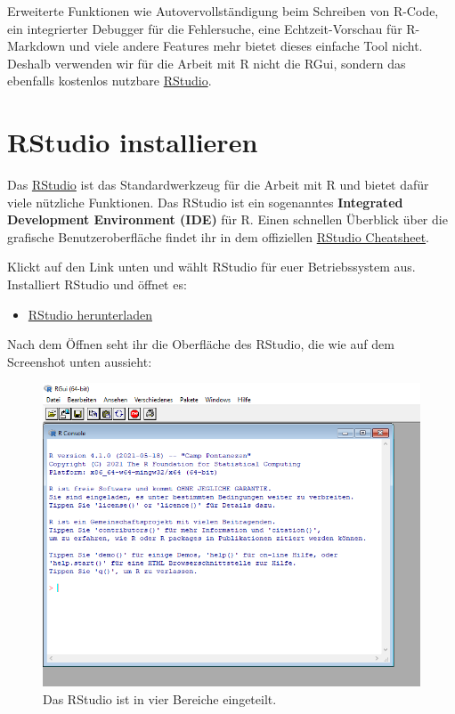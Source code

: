 \documentclass[
]{book}
\providecommand{\tightlist}{%
  \setlength{\itemsep}{0pt}\setlength{\parskip}{0pt}}
\begin{document}
Erweiterte Funktionen wie Autovervollständigung beim Schreiben von R-Code, ein integrierter Debugger für die Fehlersuche, eine Echtzeit-Vorschau für R-Markdown und viele andere Features mehr bietet dieses einfache Tool nicht. Deshalb verwenden wir für die Arbeit mit R nicht die RGui, sondern das ebenfalls kostenlos nutzbare \href{https://www.rstudio.com/products/rstudio/}{RStudio}.

\hypertarget{rstudio-installieren}{%
\section{RStudio installieren}\label{rstudio-installieren}}

Das \href{https://www.rstudio.com/}{RStudio} ist das Standardwerkzeug für die Arbeit mit R und bietet dafür viele nützliche Funktionen. Das RStudio ist ein sogenanntes \textbf{Integrated Development Environment (IDE)} für R. Einen schnellen Überblick über die grafische Benutzeroberfläche findet ihr in dem offiziellen \href{https://raw.githubusercontent.com/rstudio/cheatsheets/main/rstudio-ide.pdf}{RStudio Cheatsheet}.

Klickt auf den Link unten und wählt RStudio für euer Betriebssystem aus. Installiert RStudio und öffnet es:

\begin{itemize}
\tightlist
\item
  \href{https://www.rstudio.com/products/rstudio/download/\#download}{RStudio herunterladen}
\end{itemize}

Nach dem Öffnen seht ihr die Oberfläche des RStudio, die wie auf dem Screenshot unten aussieht:

\begin{figure}
\includegraphics[width=1\linewidth]{fig/screenshot_r_console} \caption{Das RStudio ist in vier Bereiche eingeteilt.}\label{fig:screenshot-rstudio}
\end{figure}
\end{document}
